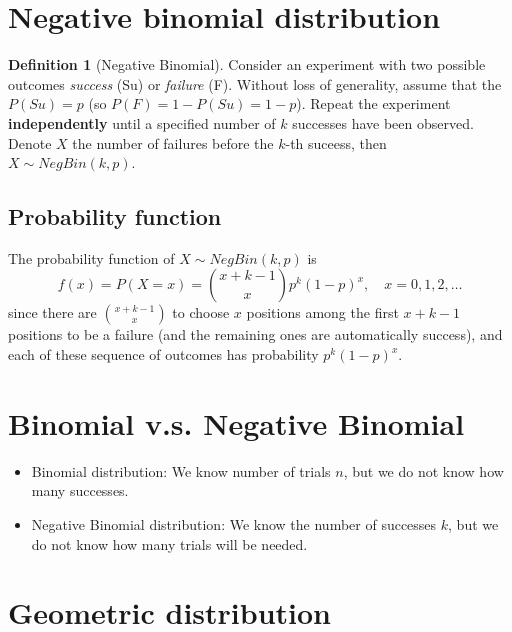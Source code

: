 \documentclass[
]{book}
\theoremstyle{definition}
\newtheorem{definition}{Definition}[chapter]
\theoremstyle{definition}
\theoremstyle{definition}
\theoremstyle{definition}
\theoremstyle{remark}
\begin{document}
\hypertarget{negative-binomial-distribution}{%
\section{Negative binomial distribution}\label{negative-binomial-distribution}}

\begin{definition}[Negative Binomial]
Consider an experiment with two possible outcomes \emph{success} (Su) or \emph{failure} (F). Without loss of generality, assume that the \(P(Su)=p\) (so \(P(F)=1-P(Su)= 1-p\)). Repeat the experiment \textbf{independently} until a specified number of \(k\) successes have been observed. Denote \(X\) the number of failures before the \(k\)-th suceess, then \(X\sim NegBin(k,p)\).
\end{definition}

\hypertarget{probability-function}{%
\subsection{Probability function}\label{probability-function}}

The probability function of \(X\sim NegBin(k,p)\) is
\[ f(x)=P(X=x)=\binom{x+k-1}{x}p^k(1-p)^x,\quad x=0,1,2,\dots\]
since there are \(\binom{x+k-1}{x}\) to choose \(x\) positions among the first \(x+k-1\) positions to be a failure (and the remaining ones are automatically success), and each of these sequence of outcomes has probability \(p^k(1-p)^x\).

\hypertarget{binomial-v.s.-negative-binomial}{%
\section{Binomial v.s. Negative Binomial}\label{binomial-v.s.-negative-binomial}}

\begin{itemize}
\item
  Binomial distribution: We know number of trials \(n\), but we do not know how many successes.
\item
  Negative Binomial distribution: We know the number of successes \(k\), but we do not know how many trials will be needed.
\end{itemize}

\hypertarget{geometric-distribution}{%
\section{Geometric distribution}\label{geometric-distribution}}
\end{document}

